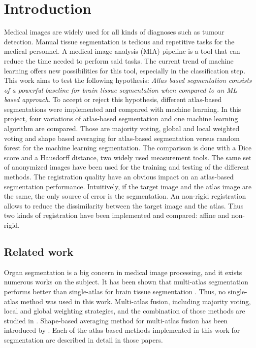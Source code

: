 \section*{Introduction}
Medical images are widely used for all kinds of diagnoses such as tumour detection. Manual tissue segmentation is tedious and repetitive tasks for the medical personnel. A medical image analysis (MIA) pipeline is a tool that can reduce the time needed to perform said tasks. The current trend of machine learning offers new possibilities for this tool, especially in the classification step.
This work aims to test the following hypothesis: \textit{Atlas based segmentation consists of a powerful baseline for brain tissue segmentation when compared to an ML based approach}. To accept or reject this hypothesis, different atlas-based segmentations were implemented and compared with machine learning.
In this project, four variations of atlas-based segmentation and one machine learning algorithm are compared. Those are majority voting, global and local weighted voting and shape based averaging for atlas-based segmentation versus random forest for the machine learning segmentation. The comparison is done with a Dice score and a Hausdorff distance, two widely used measurement tools. The same set of anonymized images have been used for the training and testing of the different methods. The registration quality have an obvious impact on an atlas-based segmentation performance. Intuitively, if the target image and the atlas image are the same, the only source of error is the segmentation. An non-rigid registration allows to reduce the dissimilarity between the target image and the atlas. Thus two kinds of registration have been implemented and compared: affine and non-rigid.

\subsection*{Related work}
Organ segmentation is a big concern in medical image processing, and it exists numerous works on the subject. It has been shown that multi-atlas segmentation performs better than single-atlas for brain tissue segmentation \cite{Klein2005}. Thus, no single-atlas method was used in this work. Multi-atlas fusion, including majority voting, local and global weighting strategies, and the combination of those methods are studied in \cite{Artaechevarria2009}.
Shape-based averaging method for multi-atlas fusion has been introduced by \cite{Rohlfing2007}.
Each of the atlas-based methods implemented in this work for segmentation are described in detail in those papers.